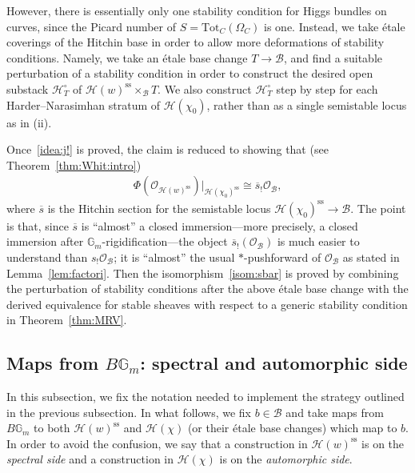 \documentclass[11pt,oneside,a4paper,mathscr]{amsart}
\theoremstyle{definition}
\newcommand{\cH}{\mathcal{H}}
\newcommand{\cB}{\mathcal{B}}
\newcommand{\cO}{\mathcal{O}}
\newcommand{\bgm}{B\mathbb{G}_m}
\begin{document}
However, there is essentially only one stability condition for Higgs bundles on curves, since the 
Picard number of $S=\mathrm{Tot}_C(\Omega_C)$ is one. Instead, we take \'etale coverings of the 
Hitchin base in order to allow more deformations of stability conditions. Namely, we take an
\'etale base change $T\to \cB$, and find a suitable perturbation of a stability condition in order
to construct the desired open substack
$\cH_T^{\circ}$ of $\cH(w)^{\mathrm{ss}}\times_{\cB}T$. We also construct 
$\cH_T^{\circ}$ step by step for each Harder--Narasimhan stratum of $\cH(\chi_0)$, rather than as
a single semistable locus as in (ii). 

Once~\eqref{idea:j!} is proved, the claim is reduced to showing that
(see Theorem~\ref{thm:Whit:intro})
\begin{align}\label{isom:sbar}
    \Phi(\cO_{\cH(w)^{\mathrm{ss}}})|_{\cH(\chi_0)^{\mathrm{ss}}}
    \cong \overline{s}_! \mathcal{O}_{\cB},
\end{align}
where $\overline{s}$ is the Hitchin section for the semistable locus 
$\cH(\chi_0)^{\mathrm{ss}} \to \cB$. The point is that, since $\overline{s}$ is ``almost'' 
a closed immersion---more precisely, a closed immersion after $\mathbb{G}_m$-rigidification---the object 
$\overline{s}_!(\cO_{\cB})$ is much easier to understand than $s_{!}\cO_{\cB}$; it is 
``almost'' the usual $*$-pushforward of $\cO_{\cB}$ as stated in Lemma~\ref{lem:factori}.
Then the isomorphism~\eqref{isom:sbar} is proved by combining the perturbation of stability 
conditions after the above \'etale base change with the derived equivalence for 
stable sheaves with respect to a generic stability condition in Theorem~\ref{thm:MRV}.





\subsection[Maps from BGm: spectral and automorphic side]{Maps from \texorpdfstring{$\bgm$}{BGm}: spectral and automorphic side}\label{subsec:setting}
In this subsection, we fix the notation needed to implement the strategy outlined in the previous subsection.
In what follows, we fix $b\in \cB$ and take maps from $\bgm$ to both $\cH(w)^{\mathrm{ss}}$ and $\cH(\chi)$
(or their \'{e}tale base changes) which map to $b$. In order to avoid the confusion, 
we say that a construction in $\cH(w)^{\mathrm{ss}}$ is on the \textit{spectral side} and
a construction in $\cH(\chi)$ is on the \textit{automorphic side}. 
\end{document}
